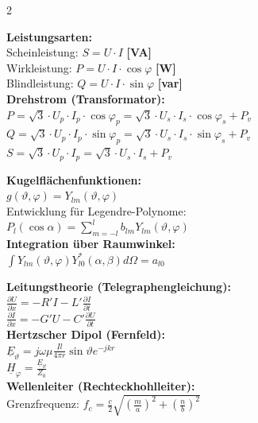 \documentclass[a4paper, 7.5pt]{extarticle}
\newcommand{\unitbox}[1]{\textnormal{\small\textcolor{boxtitle}{\textbf{[#1]}}}}
\begin{document}
\begin{multicols*}{2}
\begin{tcolorbox}[title={Wechselstrom \& Drehstrom (Leistung)}]
\textbf{Leistungsarten:}\\
Scheinleistung: $S = U \cdot I$ \unitbox{VA}\\
Wirkleistung: $P = U \cdot I \cdot \cos\varphi$ \unitbox{W}\\
Blindleistung: $Q = U \cdot I \cdot \sin\varphi$ \unitbox{var}\\[3pt]
\textbf{Drehstrom (Transformator):}\\
$P = \sqrt{3} \cdot U_p \cdot I_p \cdot \cos\varphi_p = \sqrt{3} \cdot U_s \cdot I_s \cdot \cos\varphi_s + P_v$\\
$Q = \sqrt{3} \cdot U_p \cdot I_p \cdot \sin\varphi_p = \sqrt{3} \cdot U_s \cdot I_s \cdot \sin\varphi_s + P_v$\\
$S = \sqrt{3} \cdot U_p \cdot I_p = \sqrt{3} \cdot U_s \cdot I_s + P_v$
\end{tcolorbox}

\begin{tcolorbox}[title={Kugelfunktionen (Additionstheorem)}]
\textbf{Kugelflächenfunktionen:}\\
$g(\vartheta, \varphi) = Y_{lm}(\vartheta, \varphi)$\\
Entwicklung für Legendre-Polynome:\\
$P_l(\cos \alpha) = \sum_{m=-l}^{l} b_{lm} Y_{lm}(\vartheta, \varphi)$\\[3pt]
\textbf{Integration über Raumwinkel:}\\
$\int Y_{lm}(\vartheta, \varphi) Y_{l0}^*(\alpha, \beta) d\Omega = a_{l0}$
\end{tcolorbox}

\begin{tcolorbox}[title={Ergänzende Modelle (aus Bildreferenzen)}]
\textbf{Leitungstheorie (Telegraphengleichung):}\\
$\frac{\partial U}{\partial x} = -R' I - L' \frac{\partial I}{\partial t}$\\
$\frac{\partial I}{\partial x} = -G' U - C' \frac{\partial U}{\partial t}$\\[3pt]
\textbf{Hertzscher Dipol (Fernfeld):}\\
$\underline{E}_\vartheta = j \omega \mu \frac{\underline{I} l}{4 \pi r} \sin\vartheta e^{-jkr}$\\
$\underline{H}_\varphi = \frac{\underline{E}_\vartheta}{Z_0}$\\[3pt]
\textbf{Wellenleiter (Rechteckhohlleiter):}\\
Grenzfrequenz: $f_c = \frac{c}{2} \sqrt{(\frac{m}{a})^2 + (\frac{n}{b})^2}$
\end{tcolorbox}


\end{multicols*}
\end{document}
